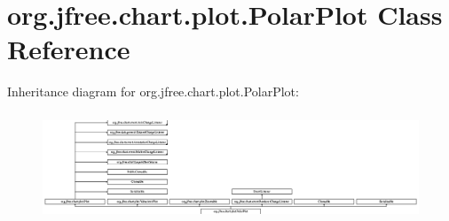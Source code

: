 \hypertarget{classorg_1_1jfree_1_1chart_1_1plot_1_1_polar_plot}{}\section{org.\+jfree.\+chart.\+plot.\+Polar\+Plot Class Reference}
\label{classorg_1_1jfree_1_1chart_1_1plot_1_1_polar_plot}
Inheritance diagram for org.\+jfree.\+chart.\+plot.\+Polar\+Plot\+:\begin{figure}[H]
\begin{center}
\leavevmode
\includegraphics[height=3.218391cm]{classorg_1_1jfree_1_1chart_1_1plot_1_1_polar_plot}
\end{center}
\end{figure}
